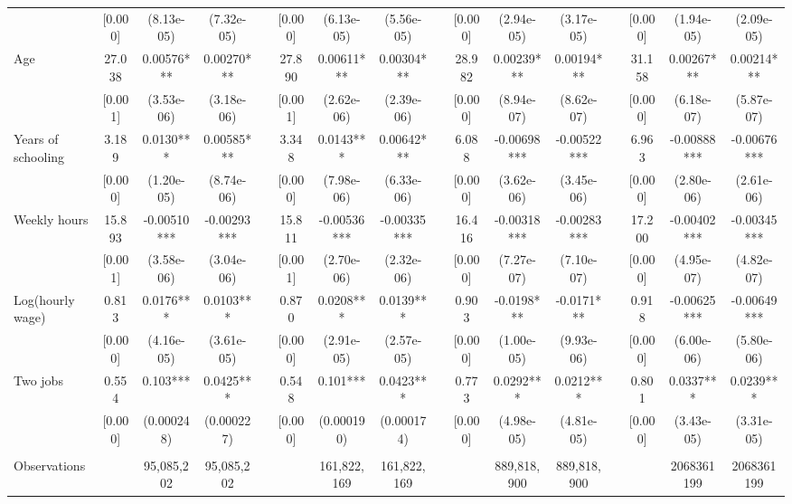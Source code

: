 \begin{tabular}{lccccccccccccccc}
      & [0.000] & (8.13e-05) & (7.32e-05) &       & [0.000] & (6.13e-05) & (5.56e-05) &       & [0.000] & (2.94e-05) & (3.17e-05) &       & [0.000] & (1.94e-05) & (2.09e-05) \\
Age   & 27.038 & 0.00576*** & 0.00270*** &       & 27.890 & 0.00611*** & 0.00304*** &       & 28.982 & 0.00239*** & 0.00194*** &       & 31.158 & 0.00267*** & 0.00214*** \\
      & [0.001] & (3.53e-06) & (3.18e-06) &       & [0.001] & (2.62e-06) & (2.39e-06) &       & [0.000] & (8.94e-07) & (8.62e-07) &       & [0.000] & (6.18e-07) & (5.87e-07) \\
Years of schooling & 3.189 & 0.0130*** & 0.00585*** &       & 3.348 & 0.0143*** & 0.00642*** &       & 6.088 & -0.00698*** & -0.00522*** &       & 6.963 & -0.00888*** & -0.00676*** \\
      & [0.000] & (1.20e-05) & (8.74e-06) &       & [0.000] & (7.98e-06) & (6.33e-06) &       & [0.000] & (3.62e-06) & (3.45e-06) &       & [0.000] & (2.80e-06) & (2.61e-06) \\
Weekly hours & 15.893 & -0.00510*** & -0.00293*** &       & 15.811 & -0.00536*** & -0.00335*** &       & 16.416 & -0.00318*** & -0.00283*** &       & 17.200 & -0.00402*** & -0.00345*** \\
      & [0.001] & (3.58e-06) & (3.04e-06) &       & [0.001] & (2.70e-06) & (2.32e-06) &       & [0.000] & (7.27e-07) & (7.10e-07) &       & [0.000] & (4.95e-07) & (4.82e-07) \\
Log(hourly wage) & 0.813 & 0.0176*** & 0.0103*** &       & 0.870 & 0.0208*** & 0.0139*** &       & 0.903 & -0.0198*** & -0.0171*** &       & 0.918 & -0.00625*** & -0.00649*** \\
      & [0.000] & (4.16e-05) & (3.61e-05) &       & [0.000] & (2.91e-05) & (2.57e-05) &       & [0.000] & (1.00e-05) & (9.93e-06) &       & [0.000] & (6.00e-06) & (5.80e-06) \\
Two jobs & 0.554 & 0.103*** & 0.0425*** &       & 0.548 & 0.101*** & 0.0423*** &       & 0.773 & 0.0292*** & 0.0212*** &       & 0.801 & 0.0337*** & 0.0239*** \\
      & [0.000] & (0.000248) & (0.000227) &       & [0.000] & (0.000190) & (0.000174) &       & [0.000] & (4.98e-05) & (4.81e-05) &       & [0.000] & (3.43e-05) & (3.31e-05) \\
      &       &       &       &       &       &       &       &       &       &       &       &       &       &       &  \\
\midrule
Observations &       & 95,085,202 & 95,085,202 &       &       & 161,822,169 & 161,822,169 &       &       & 889,818,900 & 889,818,900 &       &       & 2068361199 & 2068361199 \\

\end{tabular}
